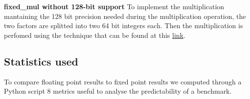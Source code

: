 \textbf{fixed\_mul without 128-bit support}\newline
To implement the multiplication mantaining the 128 bit precision needed during the multiplication operation,  the two factors are splitted into two 64 bit integers each. Then the multiplication is perfomed using the technique that can be found at this \href{https://stackoverflow.com/questions/31652875/fastest-way-to-multiply-two-64-bit-ints-to-128-bit-then-to-64-bit}{link}.



\subsection{Statistics used}
To compare floating point results to fixed point results we computed through a Python script 8 metrics useful to analyse the predictability of a benchmark.

